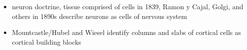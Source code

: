\subsubsection{\label{sec:neuroscience_history}}
\begin{itemize}
\item neuron doctrine, tissue comprised of cells in 1839, Ramon y Cajal, Golgi, and others in 1890s describe neurons as cells of nervous system
\item Mountcastle/Hubel and Wiesel identify columns and slabs of cortical cells as cortical building blocks
\end{itemize}